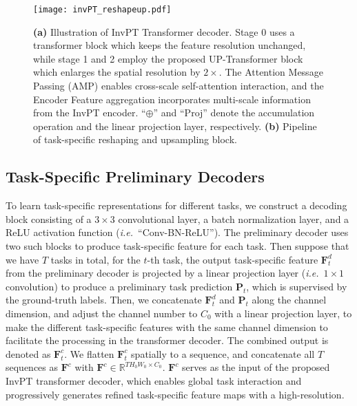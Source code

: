 \documentclass[runningheads]{llncs}
\newcommand*{\ie}{\emph{i.e.}}
\begin{document}
\begin{figure}[t]
\vspace{-10pt}
\centering
\texttt{[image: invPT\_reshapeup.pdf]}
\vspace{-10pt}
\caption{\textbf{(a)} Illustration of InvPT Transformer decoder. Stage 0 uses a transformer block which keeps the feature resolution unchanged, while stage 1 and 2 employ the proposed UP-Transformer block which enlarges the spatial resolution by $2\times$. The Attention Message Passing (AMP) enables cross-scale self-attention interaction, and the Encoder Feature aggregation incorporates multi-scale information from the InvPT encoder.  ``$\oplus$'' and ``Proj'' denote the accumulation operation and the linear projection layer, respectively.
\textbf{(b)} Pipeline of task-specific reshaping and upsampling block.}
\label{fig:invpt_reshapeup}
\vspace{-18pt}
\end{figure}


\subsection{Task-Specific Preliminary Decoders}\label{sec:preliminarydecoders}
To learn task-specific representations for different tasks, we construct a decoding block consisting of a $3\times 3$ convolutional layer, a batch normalization layer, and a ReLU activation function (\ie~``Conv-BN-ReLU''). The preliminary decoder uses two such blocks to produce task-specific feature for each task.
Then suppose that we have $T$ tasks in total, for the $t$-th task, the output task-specific feature $\mathbf{F}_t^d$ from the preliminary decoder is projected by a linear projection layer (\ie~$1\times 1$ convolution) to produce a preliminary task prediction $\mathbf{P}_t$, which is supervised by the ground-truth labels.
Then, we concatenate $\mathbf{F}_t^{d}$ and $\mathbf{P}_t$ along the channel dimension, and adjust the channel number to $C_0$ with a linear projection layer, to make the different task-specific features with the same channel dimension to facilitate the processing in the transformer decoder.
The combined output is denoted as $\mathbf{F}_t^{c}$.
We flatten $\mathbf{F}_t^c$ spatially to a sequence, and concatenate all $T$ sequences as $\mathbf{F}^{c}$ with $\mathbf{F}^{c} \in \mathbb{R}^{TH_0 W_0 \times C_0}$. $\mathbf{F}^{c}$ serves as the input of the proposed InvPT transformer decoder, which enables global task interaction and progressively generates refined task-specific feature maps with a high-resolution.
\end{document}
